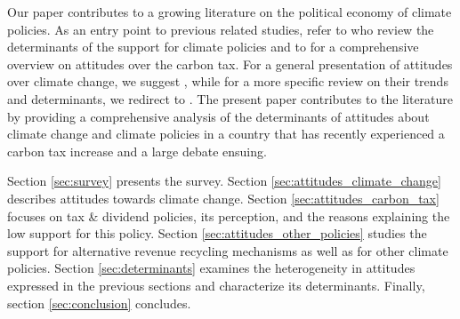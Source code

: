 \documentclass[english,5p,authoryear]{elsarticle}
\begin{document}
Our paper contributes to a growing literature on the political economy of climate policies. As an entry point to previous related studies, refer to \citet{drews_van_der_bergh_2016} who review the determinants of the support for climate policies and to \citet{carattini_overcoming_2018} for a comprehensive overview on attitudes over the carbon tax. For a general presentation of attitudes over climate change, we suggest \citet{whitmarsh_2_2018}, while for a more specific review on their trends and determinants, we redirect to \citet{brechin_public_2010}. The present paper contributes to the literature by providing a comprehensive analysis of the determinants of attitudes about climate change and climate policies in a country that has recently experienced a carbon tax increase and a large debate ensuing.




Section \ref{sec:survey} presents the survey. Section \ref{sec:attitudes_climate_change} describes attitudes towards climate change. Section \ref{sec:attitudes_carbon_tax} focuses on tax \& dividend policies, its perception, and the reasons explaining the low support for this policy. Section \ref{sec:attitudes_other_policies} studies the support for alternative revenue recycling mechanisms as well as for other climate policies. Section \ref{sec:determinants} examines the heterogeneity in attitudes expressed in the previous sections and characterize its determinants. Finally, section \ref{sec:conclusion} concludes.
\end{document}

